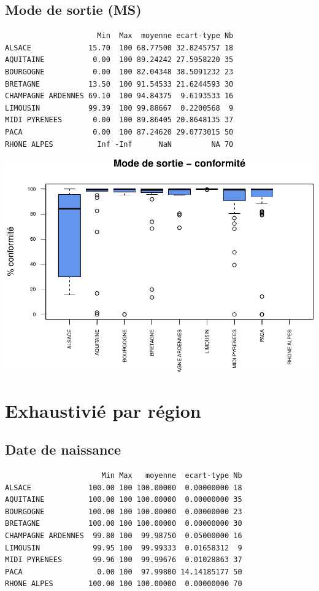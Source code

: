 \documentclass[]{article}
\begin{document}
\subsection{Mode de sortie (MS)}\label{mode-de-sortie-ms-1}

\begin{verbatim}
                     Min  Max  moyenne ecart-type Nb
ALSACE             15.70  100 68.77500 32.8245757 18
AQUITAINE           0.00  100 89.24242 27.5958220 35
BOURGOGNE           0.00  100 82.04348 38.5091232 23
BRETAGNE           13.50  100 91.54533 21.6244593 30
CHAMPAGNE ARDENNES 69.10  100 94.84375  9.6193533 16
LIMOUSIN           99.39  100 99.88667  0.2200568  9
MIDI PYRENEES       0.00  100 89.86405 20.8648135 37
PACA                0.00  100 87.24620 29.0773015 50
RHONE ALPES          Inf -Inf      NaN         NA 70
\end{verbatim}

\includegraphics{septembre2015_files/figure-latex/unnamed-chunk-27-1.pdf}

\section{Exhaustivié par région}\label{exhaustivie-par-region}

\subsection{Date de naissance}\label{date-de-naissance-2}

\begin{verbatim}
                      Min Max   moyenne  ecart-type Nb
ALSACE             100.00 100 100.00000  0.00000000 18
AQUITAINE          100.00 100 100.00000  0.00000000 35
BOURGOGNE          100.00 100 100.00000  0.00000000 23
BRETAGNE           100.00 100 100.00000  0.00000000 30
CHAMPAGNE ARDENNES  99.80 100  99.98750  0.05000000 16
LIMOUSIN            99.95 100  99.99333  0.01658312  9
MIDI PYRENEES       99.96 100  99.99676  0.01028863 37
PACA                 0.00 100  97.99800 14.14185177 50
RHONE ALPES        100.00 100 100.00000  0.00000000 70
\end{verbatim}
\end{document}
